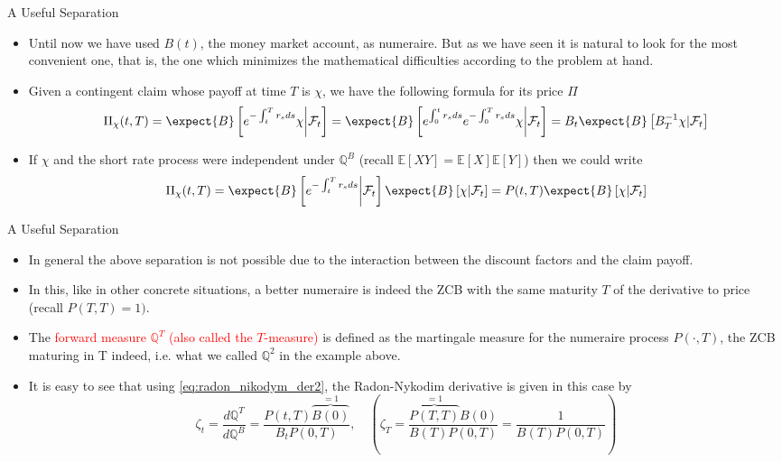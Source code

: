 \documentclass{beamer}
\begin{document}
\begin{frame}{A Useful Separation}
  \begin{itemize}
  \item<1-> Until now we have used $B(t)$, the money market account, as numeraire. But as we have seen it is natural to look for the most convenient one, that is, the one which minimizes the mathematical difficulties according to the problem at hand.
  \item<2-> Given a contingent claim whose payoff at time $T$ is $\chi$, we have the following formula for its price $\Pi$
    \begin{equation*}
      \Pi_\chi(t,T)=\expect{B}\left[e^{-\int_t^T r_s ds}\chi\bigg|\mathcal{F}_t \right]=\expect{B}\left[e^{\int_0^t r_s ds}e^{-\int_0^T r_s ds}\chi\bigg|\mathcal{F}_t \right]=B_t\expect{B}\left[B^{-1}_T\chi|\mathcal{F}_t\right]
    \end{equation*}
  \item<3-> If $\chi$ and the short rate process were independent under $\mathbb{Q}^B$ (recall $\mathbb{E}[XY]=\mathbb{E}[X]\mathbb{E}[Y]$) then we could write
    \begin{equation*}
      \Pi_\chi(t,T)=\expect{B}\left[e^{-\int_t^T r_s ds}\bigg|\mathcal{F}_t\right]\expect{B}\left[\chi|\mathcal{F}_t\right] = P(t,T)\expect{B}\left[\chi|\mathcal{F}_t\right]
    \end{equation*}
  \end{itemize}
\end{frame}

\begin{frame}{A Useful Separation}
  \begin{itemize}
  \item<1-> In general the above separation is not possible due to the interaction between the discount factors and the claim payoff. 
  \item<2-> In this, like in other concrete situations, a better numeraire is indeed the ZCB with the same maturity $T$ of the derivative to price (recall $P(T,T)=1)$.
  \item<3-> The \textcolor{red}{forward measure $\mathbb{Q}^T$ (also called the $T$-measure)} is defined as the martingale measure for the numeraire process $P(\cdot,T)$, the ZCB maturing in T indeed, i.e. what we called $\mathbb{Q}^2$ in the example above.
  \item<4-> It is easy to see that using \cref{eq:radon_nikodym_der2}, the Radon-Nykodim derivative is given in this case by
    \begin{equation}
      \zeta_t = \frac{d\mathbb{Q}^T}{d\mathbb{Q}^B} = \frac{P(t,T)\overbrace{B(0)}^{=1}}{B_t P(0,T)} ,\quad\left(\zeta_T=\frac{\overbrace{P(T,T)}^{=1}B(0)}{B(T)P(0,T)}=\frac{1}{B(T)P(0,T)}\right)
      \label{eq:radon_nikodym_t_forward}
    \end{equation}
  \end{itemize}
\end{frame}
\end{document}
